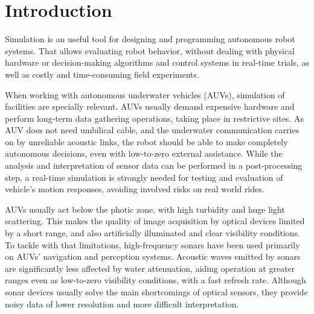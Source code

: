 \documentclass[final,5p,times]{elsarticle}
\begin{document}
\linenumbers

\section{Introduction}
\label{introduction}

Simulation is an useful tool for designing and programming autonomous robot
systems. That allows evaluating robot behavior, without dealing with physical
hardware or decision-making algorithms and control systems in real-time
trials, as well as costly and time-consuming field experiments.

When working with autonomous underwater vehicles (AUVs), simulation of
facilities are specially relevant. AUVs usually demand expensive hardware and
perform long-term data gathering operations, taking place in restrictive
sites. As AUV does not need umbilical cable, and the underwater communication
carries on by unreliable acoustic links, the robot should be able to make
completely autonomous decisions, even with low-to-zero external assistance.
While the analysis and interpretation of sensor data can be performed in a
post-processing step, a real-time simulation is strongly needed for testing
and evaluation of vehicle's motion responses, avoiding involved risks on
real world rides.

AUVs usually act below the photic zone, with high turbidity and huge light
scattering. This makes the quality of image acquisition by optical devices
limited by a short range, and also artificially illuminated and clear visibility
conditions. To tackle with that limitations, high-frequency sonars have been
used primarily on AUVs' navigation and perception systems. Acoustic waves
emitted by sonars are significantly less affected by water attenuation,
aiding operation at greater ranges even as low-to-zero visibility conditions,
with a fast refresh rate. Although sonar devices usually solve the main
shortcomings of optical sensors, they provide noisy data of lower
resolution and more difficult interpretation.
\end{document}
